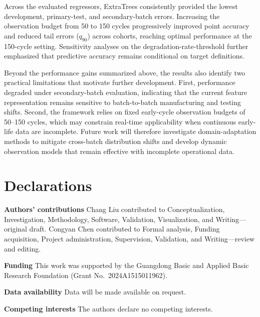 \documentclass[pdflatex,sn-mathphys-num]{sn-jnl}
\begin{document}
Across the evaluated regressors, ExtraTrees consistently provided the lowest development, primary-test, and secondary-batch errors. Increasing the observation budget from 50 to 150 cycles progressively improved point accuracy and reduced tail errors ($q_{90}$) across cohorts, reaching optimal performance at the 150-cycle setting. Sensitivity analyses on the degradation-rate-threshold further emphasized that predictive accuracy remains conditional on target definitions.

Beyond the performance gains summarized above, the results also identify two practical limitations that motivate further development. First, performance degraded under secondary-batch evaluation, indicating that the current feature representation remains sensitive to batch-to-batch manufacturing and testing shifts. Second, the framework relies on fixed early-cycle observation budgets of 50--150 cycles, which may constrain real-time applicability when continuous early-life data are incomplete. Future work will therefore investigate domain-adaptation methods to mitigate cross-batch distribution shifts and develop dynamic observation models that remain effective with incomplete operational data.

\backmatter

\section*{Declarations}

\noindent\textbf{Authors' contributions} Chang Liu contributed to Conceptualization, Investigation, Methodology, Software, Validation, Visualization, and Writing---original draft. Congyan Chen contributed to Formal analysis, Funding acquisition, Project administration, Supervision, Validation, and Writing---review and editing.

\noindent\textbf{Funding} This work was supported by the Guangdong Basic and Applied Basic Research Foundation (Grant No.~2024A1515011962).

\noindent\textbf{Data availability} Data will be made available on request.

\noindent\textbf{Competing interests} The authors declare no competing interests.

\setlength{\bibsep}{0pt}

\end{document}
